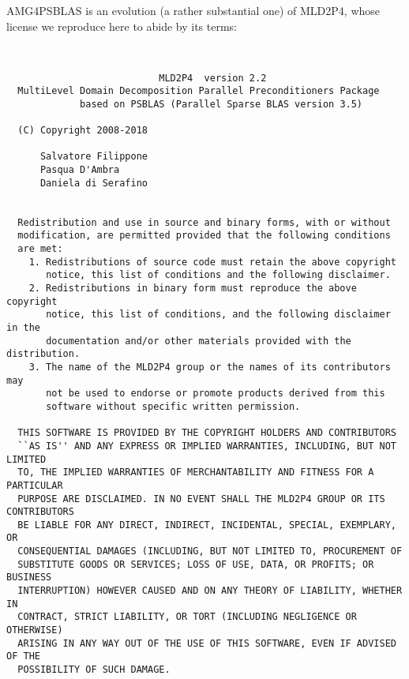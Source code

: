 \newpage
AMG4PSBLAS is an evolution (a rather substantial one) of MLD2P4, whose
license we reproduce here to abide by its terms:
{\small
\begin{verbatim}

 
                           MLD2P4  version 2.2
  MultiLevel Domain Decomposition Parallel Preconditioners Package
             based on PSBLAS (Parallel Sparse BLAS version 3.5)
  
  (C) Copyright 2008-2018

      Salvatore Filippone  
      Pasqua D'Ambra   
      Daniela di Serafino   

 
  Redistribution and use in source and binary forms, with or without
  modification, are permitted provided that the following conditions
  are met:
    1. Redistributions of source code must retain the above copyright
       notice, this list of conditions and the following disclaimer.
    2. Redistributions in binary form must reproduce the above copyright
       notice, this list of conditions, and the following disclaimer in the
       documentation and/or other materials provided with the distribution.
    3. The name of the MLD2P4 group or the names of its contributors may
       not be used to endorse or promote products derived from this
       software without specific written permission.
 
  THIS SOFTWARE IS PROVIDED BY THE COPYRIGHT HOLDERS AND CONTRIBUTORS
  ``AS IS'' AND ANY EXPRESS OR IMPLIED WARRANTIES, INCLUDING, BUT NOT LIMITED
  TO, THE IMPLIED WARRANTIES OF MERCHANTABILITY AND FITNESS FOR A PARTICULAR
  PURPOSE ARE DISCLAIMED. IN NO EVENT SHALL THE MLD2P4 GROUP OR ITS CONTRIBUTORS
  BE LIABLE FOR ANY DIRECT, INDIRECT, INCIDENTAL, SPECIAL, EXEMPLARY, OR
  CONSEQUENTIAL DAMAGES (INCLUDING, BUT NOT LIMITED TO, PROCUREMENT OF
  SUBSTITUTE GOODS OR SERVICES; LOSS OF USE, DATA, OR PROFITS; OR BUSINESS
  INTERRUPTION) HOWEVER CAUSED AND ON ANY THEORY OF LIABILITY, WHETHER IN
  CONTRACT, STRICT LIABILITY, OR TORT (INCLUDING NEGLIGENCE OR OTHERWISE)
  ARISING IN ANY WAY OUT OF THE USE OF THIS SOFTWARE, EVEN IF ADVISED OF THE
  POSSIBILITY OF SUCH DAMAGE.
 
\end{verbatim}
  }